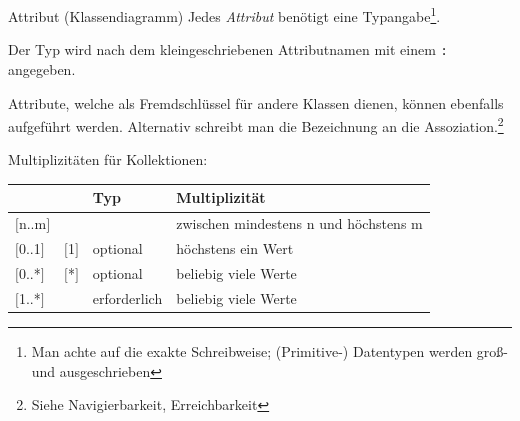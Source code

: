 \begin{diag}{Attribut (Klassendiagramm)}
    Jedes \emph{Attribut} benötigt eine Typangabe\footnote{Man achte auf die exakte Schreibweise; (Primitive-) Datentypen werden groß- und ausgeschrieben}.

    Der Typ wird nach dem kleingeschriebenen Attributnamen mit einem \texttt{:} angegeben.

    Attribute, welche als Fremdschlüssel für andere Klassen dienen, können ebenfalls aufgeführt werden.
    Alternativ schreibt man die Bezeichnung an die Assoziation.\footnote{Siehe Navigierbarkeit, Erreichbarkeit}

    Multiplizitäten für Kollektionen:

    \begin{tabular}{>{\ttfamily}l>{\ttfamily}lll}
        \multicolumn{1}{l}{Symbol} & \multicolumn{1}{l}{alternativ} & Typ          & {Multiplizität}                       \\
        \hline
        $[$n..m$]$                 &                                &              & zwischen mindestens n und höchstens m \\
        $[$0..1$]$                 & $[$1$]$                        & optional     & höchstens ein Wert                    \\
        $[$0..*$]$                 & $[$*$]$                        & optional     & beliebig viele Werte                  \\
        $[$1..*$]$                 &                                & erforderlich & beliebig viele Werte
    \end{tabular}
\end{diag}

